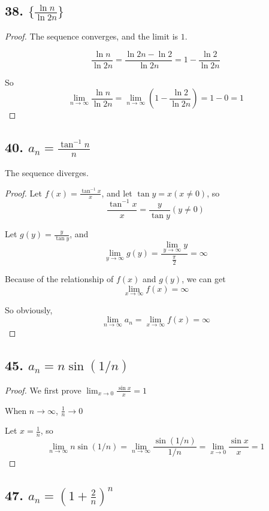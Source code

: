 \documentclass{article}
\begin{document}
    \subsection*{38. $\{ \frac{\ln n}{\ln 2n}\}$}
    \begin{proof}
        
        The sequence converges, and the limit is $1$.


        $$\frac{\ln n}{\ln 2n} = \frac{\ln 2n - \ln 2}{\ln 2n} = 1 - \frac{\ln 2}{\ln 2n}$$

        So $$\lim_{n \to \infty}\frac{\ln n}{\ln 2n} = \lim_{n \to \infty}(1 - \frac{\ln 2}{\ln 2n}) = 1 - 0 = 1$$
    \end{proof}

    \subsection*{40. $a_n = \frac{\tan^{-1}n}{n}$}
    The sequence diverges.
    \begin{proof}
        Let $f(x) = \frac{\tan^{-1}x}{x}$, and let $\tan y = x(x \not = 0)$, so $$\frac{\tan^{-1}x}{x} = \frac{y}{\tan y}(y \not = 0)$$

        Let $g(y) = \frac{y}{\tan y}$, and $$\lim_{y \to \infty}g(y) = \frac{\lim_{y \to \infty}y}{\frac{\pi}{2}} = \infty$$

        Because of the relationship of $f(x)$ and $g(y)$, we can get $$\lim_{x \to \infty}f(x) = \infty$$

        So obviously, $$\lim_{n \to \infty}a_n = \lim_{x \to \infty}f(x) = \infty$$
    \end{proof}

    \subsection*{45. $a_n = n \sin(1/n)$}

    \begin{proof}
        
        We first prove $\lim_{x \to 0}\frac{\sin x}{x} = 1$
        

        When $n \to \infty$, $\frac{1}{n} \to 0$

        Let $x = \frac{1}{n}$, so $$\lim_{n \to \infty}n\sin(1/n) = \lim_{n \to \infty}\frac{\sin(1/n)}{1/n} = \lim_{x\to 0}\frac{\sin x}{x} = 1$$

    \end{proof}

    \subsection*{47. $a_n = (1 + \frac{2}{n}) ^n$}
\end{document}
